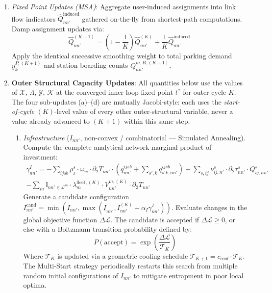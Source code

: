 \documentclass[11pt,a4paper]{article}
\newcommand{\ProjBnd}[3]{\min\left(#3, \max\left(#2, #1\right)\right)}
\begin{document}
\begin{enumerate}
\begin{enumerate}
\begin{enumerate}
            \item \textit{Inner Loop Convergence Check}: Loop until the reduced residual norm satisfies $\|\nabla \mathcal{L}_t\|_{\infty} < \epsilon_{int}$. Denote the converged inner-loop fixed point by superscript $t^*$.
        \end{enumerate}
        \item \textit{Fixed Point Updates (MSA)}: Aggregate user-induced assignments into link flow indicators $\hat Q_{nn'}^{\text{induced}}$ gathered on-the-fly from shortest-path computations. Damp assignment updates via:
        \begin{equation}
            \hat Q_{nn'}^{(K+1)} = \left(1-\frac{1}{K}\right)\hat Q_{nn'}^{(K)} + \frac{1}{K} \hat Q_{nn'}^{\text{induced}}
        \end{equation}
        Apply the identical successive smoothing weight to total parking demand $y_k^{P,(K+1)}$ and station boarding counts $Q_{nn'}^{m,B,(K+1)}$.
        \item \textbf{Outer Structural Capacity Updates}: All quantities below use the values of $\mathcal{X}$, $\Lambda$, $\mathcal{Y}$, $\mathcal{K}$ at the converged inner-loop fixed point $t^*$ for outer cycle $K$. The four sub-updates (a)--(d) are mutually Jacobi-style: each uses the \emph{start-of-cycle} $(K)$-level value of every other outer-structural variable, never a value already advanced to $(K+1)$ within this same step.
        \begin{enumerate}
            \item \emph{Infrastructure} ($I_{nn'}$, non-convex / combinatorial — Simulated Annealing). Compute the complete analytical network marginal product of investment:
            \begin{align}
                \gamma^I_{nn'} = -\sum_{ijsb} \rho^s_j \cdot \omega_w \cdot \partial_2 T_{nn'} \cdot \left( q^{ijsb}_{nn'} + \sum_{s',k} q^{ijsb}_{s'k,nn'} \right) + \sum_{s,ij} \nu^s_{ij,n'} \cdot \partial_2 \tau^s_{nn'} \cdot Q^s_{ij,nn'} \nonumber \\
                - \sum_{m} \mathbb{I}_{nn' \in \mathcal{L}^m} \cdot \lambda_m^{\text{fleet},(K)} \cdot V_{nn'}^{m,(K)} \cdot \partial_2 T_{nn'}
            \end{align}
            Generate a candidate configuration $I_{nn'}^{\text{cand}} = \ProjBnd{I_{nn'}^{(K)} + \alpha_I \gamma^I_{nn'}}{\underline{I}_{nn'}}{\overline{I}_{nn'}}$. Evaluate changes in the global objective function $\Delta \mathcal{L}$. The candidate is accepted if $\Delta \mathcal{L} \ge 0$, or else with a Boltzmann transition probability defined by:
            \begin{equation}
                P(\text{accept}) = \exp\left( \frac{\Delta \mathcal{L}}{\mathcal{T}_K} \right)
            \end{equation}
            Where $\mathcal{T}_K$ is updated via a geometric cooling schedule $\mathcal{T}_{K+1} = c_{cool} \cdot \mathcal{T}_K$. The Multi-Start strategy periodically restarts this search from multiple random initial configurations of $I_{nn'}$ to mitigate entrapment in poor local optima.


\end{enumerate}
\end{enumerate}
\end{enumerate}
\end{document}
